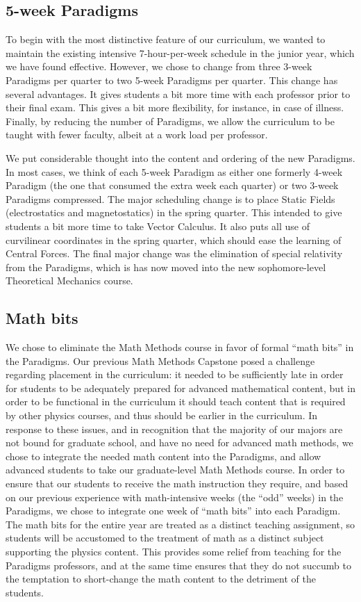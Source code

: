 \documentclass[english,aps,pra,reprint,noshowpacs,superscriptaddress]{revtex4-1}
\begin{document}
\subsection{5-week Paradigms}
To begin with the most distinctive feature of our curriculum, we
wanted to maintain the existing intensive 7-hour-per-week schedule in
the junior year, which we have found effective.  However, we chose to
change from three 3-week Paradigms per quarter to two 5-week Paradigms
per quarter.    This change has several advantages.  It gives students
a bit more time with each professor prior to their final exam.  This
gives a bit more flexibility, for instance, in case of illness.
Finally, by reducing the number of Paradigms, we allow the curriculum
to be taught with fewer faculty, albeit at a work load per professor.

We put considerable thought into the content and ordering of the new
Paradigms.  In most cases, we think of each 5-week Paradigm as either
one formerly 4-week Paradigm (the one that consumed the extra week
each quarter) or two 3-week Paradigms compressed.  The major
scheduling change is to place Static Fields (electrostatics and
magnetostatics) in the spring quarter.  This intended to give students
a bit more time to take Vector Calculus.  It also puts all use of
curvilinear coordinates in the spring quarter, which should ease the
learning of Central Forces.  The final major change was the
elimination of special relativity from the Paradigms, which is has now
moved into the new sophomore-level Theoretical Mechanics course.

\subsection{Math bits}
We chose to eliminate the Math Methods course in favor of formal
``math bits'' in the Paradigms.  Our previous Math Methods Capstone
posed a challenge regarding placement in the curriculum: it needed to
be sufficiently late in order for students to be adequately prepared
for advanced mathematical content, but in order to be functional in
the curriculum it should teach content that is required by other
physics courses, and thus should be earlier in the curriculum.  In
response to these issues, and in recognition that the majority of our
majors are not bound for graduate school, and have no need for
advanced math methods, we chose to integrate the needed math content
into the Paradigms, and allow advanced students to take our
graduate-level Math Methods course.  In order to ensure that our
students to receive the math instruction they require, and based on
our previous experience with math-intensive weeks (the ``odd'' weeks)
in the Paradigms, we chose to integrate one week of ``math bits'' into
each Paradigm.  The math bits for the entire year are treated as a
distinct teaching assignment, so students will be accustomed to the
treatment of math as a distinct subject supporting the physics
content.  This provides some relief from teaching for the Paradigms
professors, and at the same time ensures that they do not succumb to
the temptation to short-change the math content to the detriment of
the students.
\end{document}
